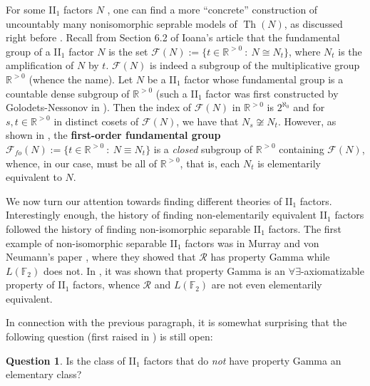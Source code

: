 \documentclass[12pt]{amsart}
\theoremstyle{definition}
\newtheorem{question}[thm]{Question}
\def\bb{\mathbb}
\def\bb{\mathbb}
\def\cal{\mathcal}
\def \Th{\operatorname{Th}}
\def \R{\mathcal R}
\begin{document}
For some II$_1$ factors $N$ , one can find a more ``concrete'' construction of uncountably many nonisomorphic seprable models of $\Th(N)$, as discussed right before \cite[Theorem 4.3]{mtoa3}.  Recall from Section 6.2 of Ioana's article that the fundamental group of a II$_1$ factor $N$ is the set $\cal F(N):=\{t\in \bb R^{>0} \ : \ N\cong N_t\}$, where $N_t$ is the amplification of $N$ by $t$.  $\cal F(N)$ is indeed a subgroup of the multiplicative group $\bb R^{>0}$ (whence the name).  Let $N$ be a II$_1$ factor whose fundamental group is a countable dense subgroup of $\bb R^{>0}$ (such a II$_1$ factor was first constructed by Golodets-Nessonov in \cite{GN}).  Then the index of $\cal F(N)$ in $\bb R^{>0}$ is $2^{\aleph_0}$ and for $s,t\in \bb R^{>0}$ in distinct cosets of $\cal F(N)$, we have that $N_s\not\cong N_t$.  However, as shown in \cite{GHgames}, the \textbf{first-order fundamental group} $\cal F_{fo}(N):=\{t\in \bb R^{>0} \ : \ N\equiv N_t\}$ is a \emph{closed} subgroup of $\bb R^{>0}$ containing $\cal F(N)$, whence, in our case, must be all of $\bb R^{>0}$, that is, each $N_t$ is elementarily equivalent to $N$.  


We now turn our attention towards finding different theories of II$_1$ factors.  Interestingly enough, the history of finding non-elementarily equivalent II$_1$ factors followed the history of finding non-isomorphic separable II$_1$ factors.  The first example of non-isomorphic separable II$_1$ factors was in Murray and von Neumann's paper \cite{MvN}, where they showed that $\R$ has property Gamma while $L(\bb F_2)$ does not.  In \cite[Subsection 3.2.2]{mtoa3}, it was shown that property Gamma is an $\forall\exists$-axiomatizable property of II$_1$ factors, whence $\R$ and $L(\bb F_2)$ are not even elementarily equivalent.

In connection with the previous paragraph, it is somewhat surprising that the following question (first raised in \cite[Question 3.5]{mtoa3}) is still open:

\begin{question}
Is the class of II$_1$ factors that do \emph{not} have property Gamma an elementary class?
\end{question}
\end{document}
